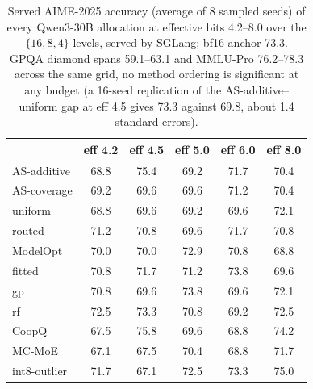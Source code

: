 \begin{table}[t]
\centering\small
\caption{Served AIME-2025 accuracy (average of 8 sampled seeds) of every Qwen3-30B allocation at
effective bits 4.2--8.0 over the $\{16,8,4\}$ levels,
served by SGLang; bf16 anchor 73.3. GPQA diamond spans 59.1--63.1 and MMLU-Pro 76.2--78.3 across the same
grid, no method ordering is significant at any budget (a
16-seed replication of the AS-additive--uniform gap at eff 4.5 gives 73.3
against 69.8, about 1.4 standard errors).}
\label{tab:ge4served30}
\begin{tabular}{lccccc}
\toprule
 & eff 4.2 & eff 4.5 & eff 5.0 & eff 6.0 & eff 8.0 \\
\midrule
AS-additive & 68.8 & 75.4 & 69.2 & 71.7 & 70.4 \\
AS-coverage & 69.2 & 69.6 & 69.6 & 71.2 & 70.4 \\
uniform & 68.8 & 69.6 & 69.2 & 69.6 & 72.1 \\
routed & 71.2 & 70.8 & 69.6 & 71.7 & 70.8 \\
ModelOpt & 70.0 & 70.0 & 72.9 & 70.8 & 68.8 \\
fitted & 70.8 & 71.7 & 71.2 & 73.8 & 69.6 \\
gp & 70.8 & 69.6 & 73.8 & 69.6 & 72.1 \\
rf & 72.5 & 73.3 & 70.8 & 69.2 & 72.5 \\
CoopQ & 67.5 & 75.8 & 69.6 & 68.8 & 74.2 \\
MC-MoE & 67.1 & 67.5 & 70.4 & 68.8 & 71.7 \\
int8-outlier & 71.7 & 67.1 & 72.5 & 73.3 & 75.0 \\
\bottomrule
\end{tabular}
\end{table}

\theoremstyle{plain}
\newtheorem{innercustomthm}{Theorem}
\newenvironment{customthm}[1]
  {\renewcommand\theinnercustomthm{#1}\innercustomthm}
  {\endinnercustomthm}
\newtheorem{innercustomprop}{Proposition}
\newenvironment{customprop}[1]
  {\renewcommand\theinnercustomprop{#1}\innercustomprop}
  {\endinnercustomprop}
\newtheorem{innercustomcor}{Corollary}
\newenvironment{customcor}[1]
  {\renewcommand\theinnercustomcor{#1}\innercustomcor}
  {\endinnercustomcor}
\newtheorem*{corollary*}{Corollary}
\newtheorem*{proposition*}{Proposition}


